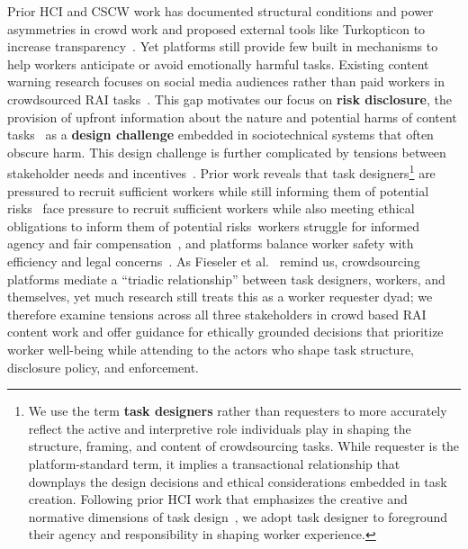 Prior HCI and CSCW work has documented structural conditions and power asymmetries in crowd work and proposed external tools like Turkopticon to increase transparency~\cite{gray2016crowd, silberman2018responsible, salehi2015we, irani2013turkopticon}. Yet platforms still provide few built in mechanisms to help workers anticipate or avoid emotionally harmful tasks. Existing content warning research focuses on social media audiences rather than paid workers in crowdsourced RAI tasks~\cite{prolific2025participant, prolific2025sensitive, ProlificAPIContentWarning2025, Zhang2024PerceptionsTriggerWarnings, shashirekha2023trigger, bell2025warning}. This gap motivates our focus on \textbf{risk disclosure}, the provision of upfront information about the nature and potential harms of content tasks~\cite{bharucha2023content, qian2025aura} as a \textbf{design challenge} embedded in sociotechnical systems that often obscure harm.
This design challenge is further complicated by tensions between stakeholder needs and incentives~\cite{finnerty2013keep, gaikwad2016boomerang, salehi2015we, irani2013turkopticon, salehi2018ink}. Prior work reveals that task designers\footnote{We use the term \textbf{task designers} rather than requesters to more accurately reflect the active and interpretive role individuals play in shaping the structure, framing, and content of crowdsourcing tasks. While requester is the platform-standard term, it implies a transactional relationship that downplays the design decisions and ethical considerations embedded in task creation. Following prior HCI work that emphasizes the creative and normative dimensions of task design~\cite{bragg2018sprout, qian2025locating}, we adopt task designer to foreground their agency and responsibility in shaping worker experience.} are pressured to recruit sufficient workers while still informing them of potential risks~\cite{qian2025locating, finnerty2013keep, kittur2008crowdsourcing, zheng2011task, bragg2018sprout} face pressure to recruit sufficient workers while also meeting ethical obligations to inform them of potential risks~\cite{qian2025locating, finnerty2013keep, kittur2008crowdsourcing, zheng2011task, bragg2018sprout}workers struggle for informed agency and fair compensation~\cite{irani2013turkopticon, salehi2018ink, martin2014being, silberman2018responsible, toxtli2021quantifying, schlicher2021flexible}, and platforms balance worker safety with efficiency and legal concerns~\cite{gillespie2010politics, xu2017incentivizing, xia2020privacy, allen2018design}. As Fieseler et al.~\cite{fieseler_unfairness_2019} remind us, crowdsourcing platforms mediate a ``triadic relationship'' between task designers, workers, and themselves, yet much research still treats this as a worker requester dyad; we therefore examine tensions across all three stakeholders in crowd based RAI content work and offer guidance for ethically grounded decisions that prioritize worker well-being while attending to the actors who shape task structure, disclosure policy, and enforcement.
